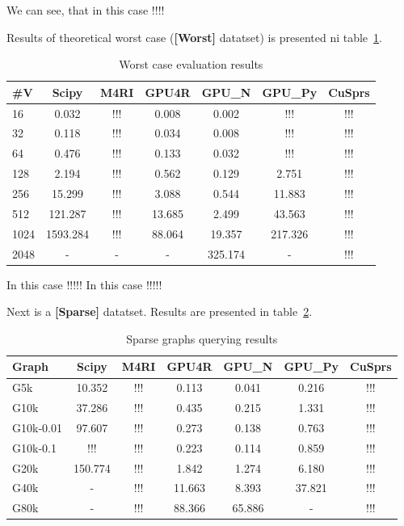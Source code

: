 We can see, that in this case !!!!

                                                                                                     
Results of theoretical worst case (\textbf{[Worst]} datatset) is presented ni table~\ref{tbl:tableWorst}.

                                                                                                     

\begin{table}[H]
\caption{Worst case evaluation results}
\label{tbl:tableWorst}
\begin{tabular}{| l | c | c | c | c | c | c | }
    \hline
    \#V  & Scipy    & M4RI    & GPU4R  & GPU\_N  & GPU\_Py & CuSprs  \\
    \hline
    \hline
    16   & 0.032    & !!!     & 0.008  & 0.002   & !!!     & !!!     \\
    32   & 0.118    & !!!     & 0.034  & 0.008   & !!!     & !!!     \\
    64   & 0.476    & !!!     & 0.133  & 0.032   & !!!     & !!!     \\
    128  & 2.194    & !!!     & 0.562  & 0.129   & 2.751   & !!!     \\
    256  & 15.299   & !!!     & 3.088  & 0.544   & 11.883  & !!!     \\
    512  & 121.287  & !!!     & 13.685 & 2.499   & 43.563  & !!!     \\
    1024 & 1593.284 & !!!     & 88.064 & 19.357  & 217.326 & !!!     \\
    2048 & -        & -       & -      & 325.174 & -       & !!!     \\
    \hline
  \end{tabular}
\end{table}


In this case !!!!!
In this case !!!!!

Next is a \textbf{[Sparse]} datatset.
Results are presented in table~\ref{tbl:tableSparse}.

\begin{table}[H]
\caption{Sparse graphs querying results}
\label{tbl:tableSparse}
\begin{tabular}{| l | c | c | c | c | c | c | }
    \hline
    Graph     & Scipy   & M4RI & GPU4R  & GPU\_N & GPU\_Py & CuSprs  \\
    \hline
    \hline
    G5k       & 10.352  & !!!  & 0.113  & 0.041  & 0.216   & !!!     \\
    G10k      & 37.286  & !!!  & 0.435  & 0.215  & 1.331   & !!!     \\
    G10k-0.01 & 97.607  & !!!  & 0.273  & 0.138  & 0.763   & !!!     \\
    G10k-0.1  & !!!     & !!!  & 0.223  & 0.114  & 0.859   & !!!     \\
    G20k      & 150.774 & !!!  & 1.842  & 1.274  & 6.180   & !!!     \\
    G40k      & -       & !!!  & 11.663 & 8.393  & 37.821  & !!!     \\
    G80k      & -       & !!!  & 88.366 & 65.886 & -       & !!!     \\
    \hline
  \end{tabular}
\end{table}


